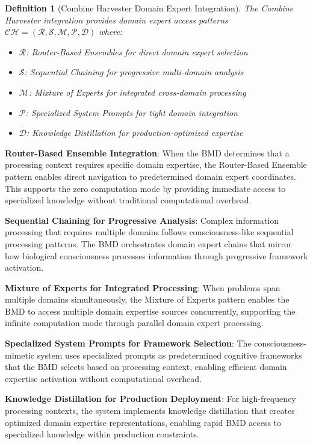 \documentclass[12pt,a4paper]{article}
\newtheorem{definition}[theorem]{Definition}
\begin{document}
\begin{definition}[Combine Harvester Domain Expert Integration]
The Combine Harvester integration provides domain expert access patterns $\mathcal{CH} = (\mathcal{R}, \mathcal{S}, \mathcal{M}, \mathcal{P}, \mathcal{D})$ where:
\begin{itemize}
\item $\mathcal{R}$: Router-Based Ensembles for direct domain expert selection
\item $\mathcal{S}$: Sequential Chaining for progressive multi-domain analysis
\item $\mathcal{M}$: Mixture of Experts for integrated cross-domain processing
\item $\mathcal{P}$: Specialized System Prompts for tight domain integration
\item $\mathcal{D}$: Knowledge Distillation for production-optimized expertise
\end{itemize}
\end{definition}

\textbf{Router-Based Ensemble Integration}: When the BMD determines that a processing context requires specific domain expertise, the Router-Based Ensemble pattern enables direct navigation to predetermined domain expert coordinates. This supports the zero computation mode by providing immediate access to specialized knowledge without traditional computational overhead.

\textbf{Sequential Chaining for Progressive Analysis}: Complex information processing that requires multiple domains follows consciousness-like sequential processing patterns. The BMD orchestrates domain expert chains that mirror how biological consciousness processes information through progressive framework activation.

\textbf{Mixture of Experts for Integrated Processing}: When problems span multiple domains simultaneously, the Mixture of Experts pattern enables the BMD to access multiple domain expertise sources concurrently, supporting the infinite computation mode through parallel domain expert processing.

\textbf{Specialized System Prompts for Framework Selection}: The consciousness-mimetic system uses specialized prompts as predetermined cognitive frameworks that the BMD selects based on processing context, enabling efficient domain expertise activation without computational overhead.

\textbf{Knowledge Distillation for Production Deployment}: For high-frequency processing contexts, the system implements knowledge distillation that creates optimized domain expertise representations, enabling rapid BMD access to specialized knowledge within production constraints.
\end{document}
